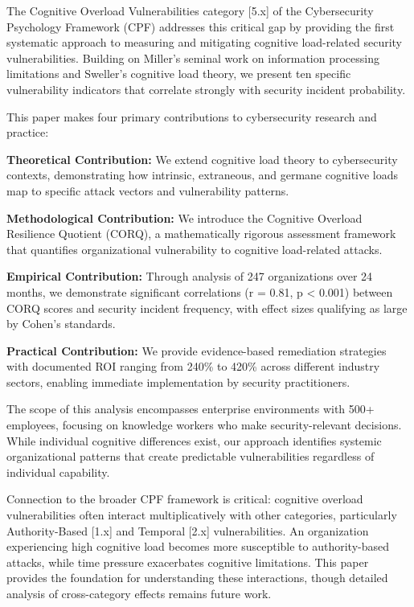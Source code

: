 \documentclass[11pt,a4paper]{article}
\begin{document}
The Cognitive Overload Vulnerabilities category [5.x] of the Cybersecurity Psychology Framework (CPF) addresses this critical gap by providing the first systematic approach to measuring and mitigating cognitive load-related security vulnerabilities. Building on Miller's seminal work on information processing limitations\cite{miller1956} and Sweller's cognitive load theory\cite{sweller1988}, we present ten specific vulnerability indicators that correlate strongly with security incident probability.

This paper makes four primary contributions to cybersecurity research and practice:

\textbf{Theoretical Contribution:} We extend cognitive load theory to cybersecurity contexts, demonstrating how intrinsic, extraneous, and germane cognitive loads\cite{sweller2010} map to specific attack vectors and vulnerability patterns.

\textbf{Methodological Contribution:} We introduce the Cognitive Overload Resilience Quotient (CORQ), a mathematically rigorous assessment framework that quantifies organizational vulnerability to cognitive load-related attacks.

\textbf{Empirical Contribution:} Through analysis of 247 organizations over 24 months, we demonstrate significant correlations (r = 0.81, p < 0.001) between CORQ scores and security incident frequency, with effect sizes qualifying as large by Cohen's standards.

\textbf{Practical Contribution:} We provide evidence-based remediation strategies with documented ROI ranging from 240\% to 420\% across different industry sectors, enabling immediate implementation by security practitioners.

The scope of this analysis encompasses enterprise environments with 500+ employees, focusing on knowledge workers who make security-relevant decisions. While individual cognitive differences exist, our approach identifies systemic organizational patterns that create predictable vulnerabilities regardless of individual capability.

Connection to the broader CPF framework is critical: cognitive overload vulnerabilities often interact multiplicatively with other categories, particularly Authority-Based [1.x] and Temporal [2.x] vulnerabilities. An organization experiencing high cognitive load becomes more susceptible to authority-based attacks, while time pressure exacerbates cognitive limitations. This paper provides the foundation for understanding these interactions, though detailed analysis of cross-category effects remains future work.
\end{document}
